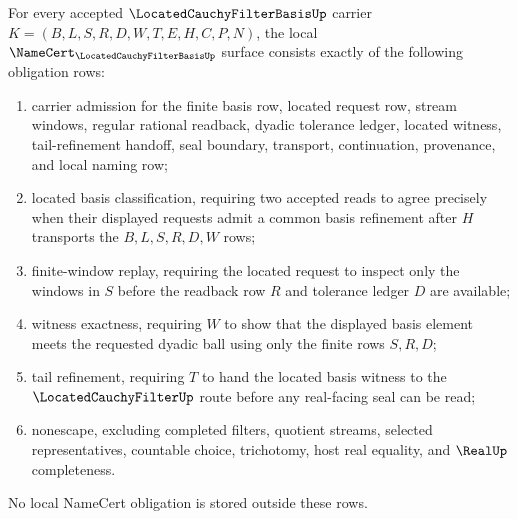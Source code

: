 \begin{theorem}
\label{thm:cauchy-filter-basis-real-obligations}
For every accepted $\LocatedCauchyFilterBasisUp$ carrier $K=(B,L,S,R,D,W,T,E,H,C,P,N)$, the local $\NameCert_{\LocatedCauchyFilterBasisUp}$ surface consists exactly of the following obligation rows:
\begin{enumerate}
\item carrier admission for the finite basis row, located request row, stream windows, regular rational readback, dyadic tolerance ledger, located witness, tail-refinement handoff, seal boundary, transport, continuation, provenance, and local naming row;
\item located basis classification, requiring two accepted reads to agree precisely when their displayed requests admit a common basis refinement after $H$ transports the $B,L,S,R,D,W$ rows;
\item finite-window replay, requiring the located request to inspect only the windows in $S$ before the readback row $R$ and tolerance ledger $D$ are available;
\item witness exactness, requiring $W$ to show that the displayed basis element meets the requested dyadic ball using only the finite rows $S,R,D$;
\item tail refinement, requiring $T$ to hand the located basis witness to the $\LocatedCauchyFilterUp$ route before any real-facing seal can be read;
\item nonescape, excluding completed filters, quotient streams, selected representatives, countable choice, trichotomy, host real equality, and $\RealUp$ completeness.
\end{enumerate}
No local NameCert obligation is stored outside these rows.
\end{theorem}
